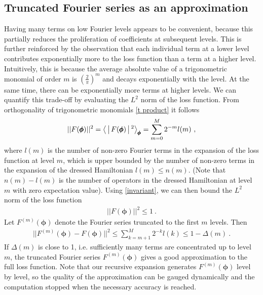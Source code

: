 \documentclass[twocolumn, amsfonts, amssymb, aps, nofootinbib]{revtex4-2}
\begin{document}
\subsection{Truncated Fourier series as an approximation} \label{sec truncation}
Having many terms on low Fourier levels appears to be convenient, because this partially reduces the proliferation of coefficients at subsequent levels. This is further reinforced by the observation that each individual term at a lower level contributes exponentially more to the loss function than a term at a higher level. Intuitively, this is because the average absolute value of a trigonometric monomial of order $m$ is $\left(\frac{2}{\pi}\right)^{m}$ and decays exponentially with the level. At the same time, there can be exponentially more terms at higher levels. We can quantify this trade-off by evaluating the $L^2$ norm of the loss function. From orthogonality of trigonometric monomials \eqref{t product} it follows
\begin{align}
	||F(\pmb\phi)||^2=\Braket{|F(\pmb\phi)|^2}_{\pmb\phi}=\sum_{m=0}^M 2^{-m}l(m) \ ,
\end{align}
where $l(m)$ is the number of non-zero Fourier terms in the expansion of the loss function at level $m$, which is upper bounded by the number of non-zero terms in the expansion of the dressed Hamiltonian $l(m)\le n(m)$. (Note that $n(m)-l(m)$ is the number of operators in the dressed Hamiltonian at level $m$ with zero expectation value). Using \eqref{invariant}, we can then bound the $L^2$ norm of the loss function
\begin{align}
	||F(\pmb\phi)||^2\le 1 \ .
\end{align}
Let $F^{(m)}(\pmb\phi)$ denote the Fourier series truncated to the first $m$ levels. Then
\begin{align}
	||F^{(m)}(\pmb\phi)-F(\pmb\phi)||^2\le \sum_{k=m+1}^M 2^{-k}l(k)\le 1-\Delta(m) \ . \label{F bound}
\end{align}
If $\Delta(m)$ is close to 1, i.e. sufficiently many terms are concentrated up to level $m$, the truncated Fourier series $F^{(m)}(\pmb\phi)$ gives a good approximation to the full loss function. Note that our recursive expansion generates $F^{(m)}(\pmb\phi)$ level by level, so the quality of the approximation can be gauged dynamically and the computation stopped when the necessary accuracy is reached.
\end{document}
